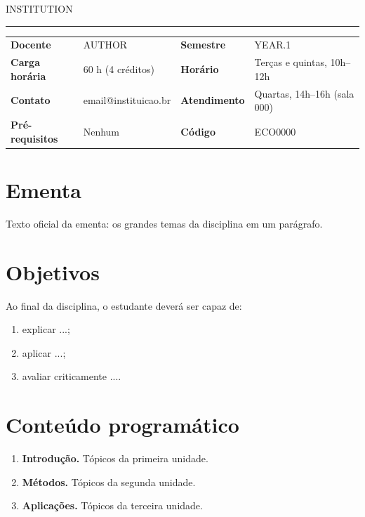 \documentclass[11pt,a4paper]{article}
\newcommand{\disciplina}{{{TITLE}}}
\newcommand{\docente}{{{AUTHOR}}}
\begin{document}
{\color{tocaGrey}\small {{INSTITUTION}}}\par
{\LARGE\bfseries\color{tocaInk}\disciplina}\par
\vspace{0.3em}
{\color{tocaHoney}\rule{2.5cm}{3pt}}

\vspace{0.8em}
\begin{tabularx}{\linewidth}{@{}>{\bfseries}l X >{\bfseries}l X@{}}
  Docente & \docente & Semestre & {{YEAR}}.1 \\
  Carga horária & 60 h (4 créditos) & Horário & Terças e quintas, 10h--12h \\
  Contato & email@instituicao.br & Atendimento & Quartas, 14h--16h (sala 000) \\
  Pré-requisitos & Nenhum & Código & ECO0000 \\
\end{tabularx}

\section{Ementa}
Texto oficial da ementa: os grandes temas da disciplina em um parágrafo.

\section{Objetivos}
Ao final da disciplina, o estudante deverá ser capaz de:
\begin{enumerate}
  \item explicar ...;
  \item aplicar ...;
  \item avaliar criticamente ....
\end{enumerate}

\section{Conteúdo programático}
\begin{enumerate}[label=\textbf{Unidade \arabic*.},leftmargin=*,align=left]
  \item \textbf{Introdução.} Tópicos da primeira unidade.
  \item \textbf{Métodos.} Tópicos da segunda unidade.
  \item \textbf{Aplicações.} Tópicos da terceira unidade.
\end{enumerate}
\end{document}
